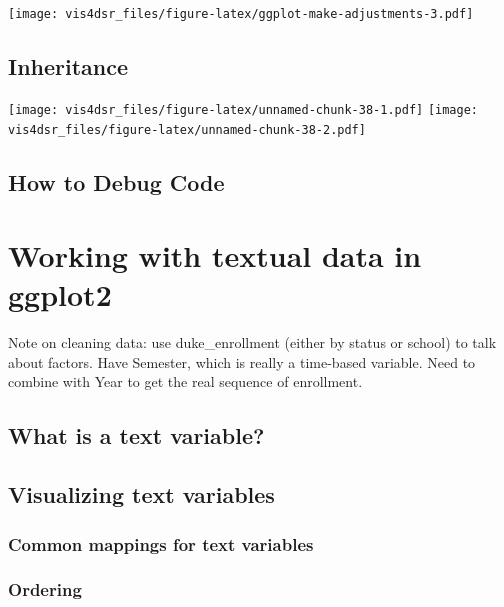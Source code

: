 \documentclass[
]{krantz}
\begin{document}
\texttt{[image: vis4dsr\_files/figure-latex/ggplot-make-adjustments-3.pdf]}

\hypertarget{inheritance}{%
\section{Inheritance}\label{inheritance}}

\texttt{[image: vis4dsr\_files/figure-latex/unnamed-chunk-38-1.pdf]} \texttt{[image: vis4dsr\_files/figure-latex/unnamed-chunk-38-2.pdf]}

\hypertarget{how-to-debug-code}{%
\section{How to Debug Code}\label{how-to-debug-code}}

\hypertarget{text-data-visualizations}{%
\chapter{Working with textual data in ggplot2}\label{text-data-visualizations}}

Note on cleaning data: use duke\_enrollment (either by status or school) to talk about factors.
Have Semester, which is really a time-based variable. Need to combine with Year
to get the real sequence of enrollment.

\hypertarget{what-is-a-text-variable}{%
\section{What is a text variable?}\label{what-is-a-text-variable}}

\hypertarget{visualizing-text-variables}{%
\section{Visualizing text variables}\label{visualizing-text-variables}}

\hypertarget{common-mappings-for-text-variables}{%
\subsection{Common mappings for text variables}\label{common-mappings-for-text-variables}}

\hypertarget{ordering}{%
\subsection{Ordering}\label{ordering}}
\end{document}
